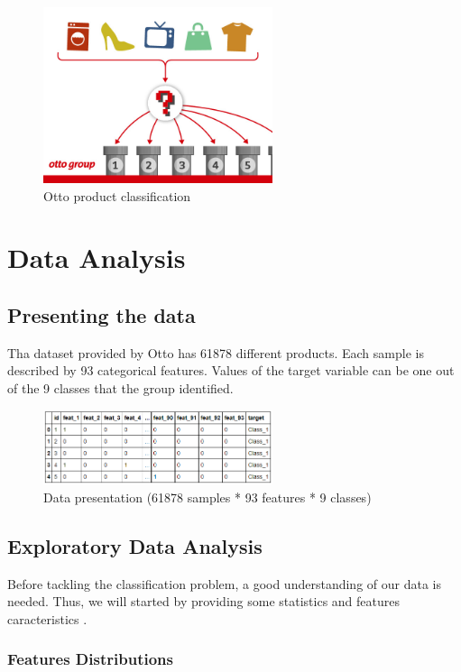 \documentclass[a4paper,english,12pt]{article}
\begin{document}
\begin{figure}[H]
	\centering
	\includegraphics[width=0.6\textwidth,keepaspectratio]{otto}
	\caption{Otto product classification}
\end{figure}

\section{Data Analysis}
\subsection{Presenting the data}

Tha dataset provided by Otto has 61878 different products. Each sample is described by 93 categorical features. Values of the target variable can be one out of the 9 classes that the group identified. 

\begin{figure}[H]
	\centering
	\includegraphics[width=0.6\textwidth,keepaspectratio]{data}
	\caption{Data presentation (61878 samples * 93 features * 9 classes)}
\end{figure}

\subsection{Exploratory Data Analysis}

Before tackling the classification problem, a good understanding of our data is needed. Thus, we will started by providing some statistics and features caracteristics .

\subsubsection{Features Distributions}
\end{document}
